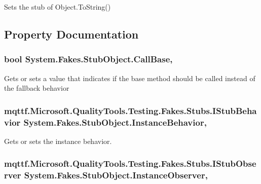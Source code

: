 Sets the stub of Object.\-To\-String()



\subsection{Property Documentation}
\hypertarget{class_system_1_1_fakes_1_1_stub_object_a7514c95b73c0358431e51bb7df9b009e}{
\subsubsection[{Call\-Base}]{\setlength{\rightskip}{0pt plus 5cm}bool System.\-Fakes.\-Stub\-Object.\-Call\-Base\hspace{0.3cm}{\ttfamily [get]}, {\ttfamily [set]}}}\label{class_system_1_1_fakes_1_1_stub_object_a7514c95b73c0358431e51bb7df9b009e}


Gets or sets a value that indicates if the base method should be called instead of the fallback behavior

\hypertarget{class_system_1_1_fakes_1_1_stub_object_a2df717840141c132373528b296fba7ec}{
\subsubsection[{Instance\-Behavior}]{\setlength{\rightskip}{0pt plus 5cm}mqttf.\-Microsoft.\-Quality\-Tools.\-Testing.\-Fakes.\-Stubs.\-I\-Stub\-Behavior System.\-Fakes.\-Stub\-Object.\-Instance\-Behavior\hspace{0.3cm}{\ttfamily [get]}, {\ttfamily [set]}}}\label{class_system_1_1_fakes_1_1_stub_object_a2df717840141c132373528b296fba7ec}


Gets or sets the instance behavior.

\hypertarget{class_system_1_1_fakes_1_1_stub_object_af56dd62c66055be575b998b81998989e}{
\subsubsection[{Instance\-Observer}]{\setlength{\rightskip}{0pt plus 5cm}mqttf.\-Microsoft.\-Quality\-Tools.\-Testing.\-Fakes.\-Stubs.\-I\-Stub\-Observer System.\-Fakes.\-Stub\-Object.\-Instance\-Observer\hspace{0.3cm}{\ttfamily [get]}, {\ttfamily [set]}}}\label{class_system_1_1_fakes_1_1_stub_object_af56dd62c66055be575b998b81998989e}


